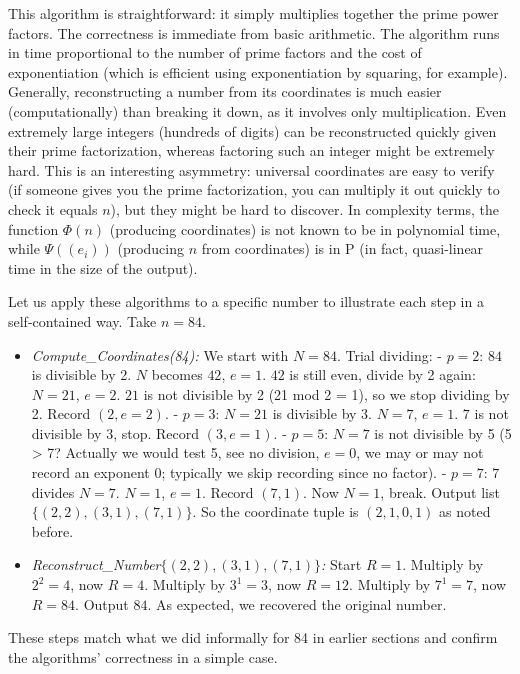 \documentclass[11pt]{article}
\begin{document}
This algorithm is straightforward: it simply multiplies together the prime power factors. The correctness is immediate from basic arithmetic. The algorithm runs in time proportional to the number of prime factors and the cost of exponentiation (which is efficient using exponentiation by squaring, for example). Generally, reconstructing a number from its coordinates is much easier (computationally) than breaking it down, as it involves only multiplication. Even extremely large integers (hundreds of digits) can be reconstructed quickly given their prime factorization, whereas factoring such an integer might be extremely hard. This is an interesting asymmetry: universal coordinates are easy to verify (if someone gives you the prime factorization, you can multiply it out quickly to check it equals $n$), but they might be hard to discover. In complexity terms, the function $\Phi(n)$ (producing coordinates) is not known to be in polynomial time, while $\Psi((e_i))$ (producing $n$ from coordinates) is in P (in fact, quasi-linear time in the size of the output).

\begin{example}
Let us apply these algorithms to a specific number to illustrate each step in a self-contained way. Take $n = 84$.
\begin{itemize}
\item \textit{Compute\_Coordinates(84):} We start with $N=84$. Trial dividing:
  - $p=2$: $84$ is divisible by 2. $N$ becomes $42$, $e=1$. $42$ is still even, divide by 2 again: $N=21$, $e=2$. $21$ is not divisible by 2 (21 mod 2 = 1), so we stop dividing by 2. Record $(2, e=2)$.
  - $p=3$: $N=21$ is divisible by 3. $N=7$, $e=1$. $7$ is not divisible by 3, stop. Record $(3, e=1)$.
  - $p=5$: $N=7$ is not divisible by 5 (5 > 7? Actually we would test 5, see no division, $e=0$, we may or may not record an exponent 0; typically we skip recording since no factor).
  - $p=7$: $7$ divides $N=7$. $N=1$, $e=1$. Record $(7,1)$. Now $N=1$, break.
  Output list $\{(2,2), (3,1), (7,1)\}$. So the coordinate tuple is $(2,1,0,1)$ as noted before.
\item \textit{Reconstruct\_Number$\{(2,2),(3,1),(7,1)\}$:} Start $R=1$. Multiply by $2^2=4$, now $R=4$. Multiply by $3^1=3$, now $R=12$. Multiply by $7^1=7$, now $R=84$. Output $84$. As expected, we recovered the original number.
\end{itemize}
These steps match what we did informally for 84 in earlier sections and confirm the algorithms' correctness in a simple case.
\end{example}
\end{document}
